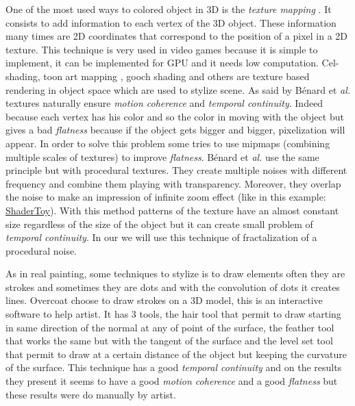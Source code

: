 One of the most used ways to colored object in 3D is the \textit{texture mapping} \cite{texture_mapping}. It consists to add information to each vertex of the 3D object. These information many times are 2D coordinates that correspond to the position of a pixel in a 2D texture. This technique is very used in video games because it is simple to implement, it can be implemented for GPU and it needs low computation. Cel-shading, toon art mapping , gooch shading and others\cite{benard_state---art_2011} are texture based rendering in object space\cite{praun_real-time_2001, klein_non-photorealistic_2000, benard_dynamic_2009, benard_dynamic_2010, freudenberg_walk-through_2001} which are used to stylize scene. As said by Bénard et \textit{al.} \cite{benard_dynamic_2009} textures naturally ensure \textit{motion coherence} and \textit{temporal continuity}. Indeed because each vertex has his color and so the color in moving with the object but gives a bad \textit{flatness} because if the object gets bigger and bigger, pixelization will appear. In order to solve this problem some\cite{klein_non-photorealistic_2000, benard_dynamic_2009} tries to use mipmaps (combining multiple scales of textures) to improve \textit{flatness}. Bénard et \textit{al.}\cite{benard_dynamic_2010} use the same principle but with procedural textures. They create multiple noises with different frequency and combine them playing with transparency. Moreover, they overlap the noise to make an impression of infinite zoom effect (like in this example: \href{https://www.shadertoy.com/view/XlBXWw?fbclid=IwAR1fU2JxQzXtks1ZcmVmzrHiv646G8w2gWceeiV-UToeFkAFMQ2NecbsGGs}{ShaderToy}). With this method patterns of the texture have an almost constant size regardless of the size of the object but it can create small problem of \textit{temporal continuity}. In our we will use this technique of fractalization of a procedural noise.



\cite{noauthor_npar_2000, chi_stylized_2006, vanderhaeghe_dynamic_nodate, pastor_real-time_2003}

As in real painting, some techniques to stylize is to draw elements often they are strokes and sometimes they are dots and with the convolution of dots it creates lines. Overcoat\cite{schmid_overcoat:_2011} choose to draw strokes on a 3D model, this is an interactive software to help artist. It has 3 tools, the hair tool that permit to draw starting in same direction of the normal at any of point of the surface, the feather tool that works the same but with the tangent of the surface and the level set tool that permit to draw at a certain distance of the object but keeping the curvature of the surface. This technique has a good \textit{temporal continuity} and on the results they present it seems to have a good \textit{motion coherence} and a good \textit{flatness} but these results were do manually by artist.

